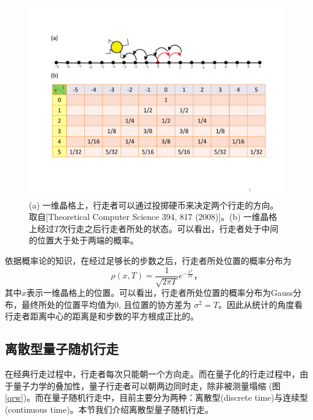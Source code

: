 \begin{figure}[htbp]
            \begin{center}
              \includegraphics[width= 0.8\columnwidth]{figures/crw.pdf}
              \caption{(a) 一维晶格上，行走者可以通过投掷硬币来决定两个行走的方向。取自[Theoretical Computer Science 394, 817 (2008)]\cite{crw2}。(b) 一维晶格上经过$T$次行走之后行走者所处的状态。可以看出，行走者处于中间的位置大于处于两端的概率。
              }
              \label{crw}
            \end{center}
        \end{figure}

依据概率论的知识，在经过足够长的步数之后，行走者所处位置的概率分布为
\begin{equation}
          \rho(x,T) = \frac{1}{\sqrt{2\pi T}}e^{-\frac{x^2}{2T}}，
 \end{equation}
 其中$x$表示一维晶格上的位置。可以看出，行走者所处位置的概率分布为Gauss分布，最终所处的位置平均值为0, 且位置的协方差为 $\sigma^2 = T$。因此从统计的角度看行走者距离中心的距离是和步数的平方根成正比的。

 \subsection{离散型量子随机行走}

 在经典行走过程中，行走者每次只能朝一个方向走。而在量子化的行走过程中，由于量子力学的叠加性，量子行走者可以朝两边同时走，除非被测量塌缩
 (图\ref{qrw})。而在量子随机行走中，目前主要分为两种：离散型(discrete time)与连续型(continuous time)。本节我们介绍离散型量子随机行走。

